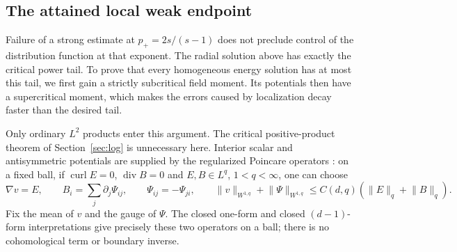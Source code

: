 \documentclass[11pt,a4paper]{article}
\numberwithin{equation}{section}
\theoremstyle{definition}
\theoremstyle{remark}\newtheorem{remark}[theorem]{Remark}
\DeclareMathOperator{\diver}{div}
\DeclareMathOperator{\curl}{curl}
\newcommand{\norm}[1]{\lVert #1\rVert}
\begin{document}
\subsection{The attained local weak endpoint}\label{subsec:weak-endpoint}

Failure of a strong estimate at \(p_+=2s/(s-1)\) does not preclude
control of the distribution function at that exponent. The radial
solution above has exactly the critical power tail. To prove that every
homogeneous energy solution has at most this tail, we first gain a
strictly subcritical field moment. Its potentials then have a
supercritical moment, which makes the errors caused by localization
decay faster than the desired tail.

Only ordinary \(L^2\) products enter this argument. The critical
positive-product theorem of Section~\ref{sec:log} is unnecessary here.
Interior scalar and antisymmetric potentials are supplied by the
regularized Poincare operators
\cite[Corollary~3.4, Remark~3.5 and Proposition~4.1(i)]{CostabelMcIntosh2010}:
on a fixed ball, if \(\curl E=0\), \(\diver B=0\) and
\(E,B\in L^q\), \(1<q<\infty\), one can choose
\begin{equation}\label{eq:weak-potentials}
 \nabla v=E,\qquad B_i=\sum_j\partial_j\Psi_{ij},\qquad
 \Psi_{ij}=-\Psi_{ji},\qquad
 \norm v_{W^{1,q}}+\norm\Psi_{W^{1,q}}
 \leq C(d,q)(\norm E_q+\norm B_q).
\end{equation}
Fix the mean of \(v\) and the gauge of \(\Psi\). The closed one-form
and closed \((d-1)\)-form interpretations give precisely these two
operators on a ball; there is no cohomological term or boundary inverse.
\end{document}
